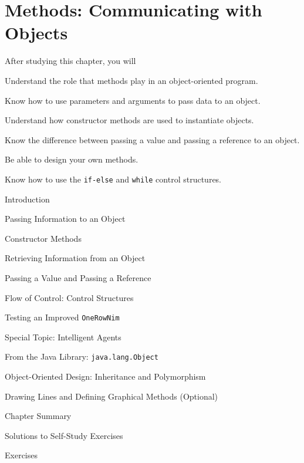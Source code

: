 
\setcounter{chapter}{2}
\setcounter{SSTUDYcount}{1}
\chapter{Methods: Communicating with Objects}
\label{chapter-methods}


\CObegin
{}
\label{objectives}
\noindent After studying this chapter, you will

\begin{COBL}
\item  Understand the role that methods play in an
  object-oriented program.
\item  Know how to use parameters and arguments to pass data to an object.
\item  Understand how constructor methods are used to instantiate objects.

\item  Know the difference between passing a value and passing a reference
   to an object.
\item  Be able to design your own methods.
\item  Know how to use the {\tt if-else} and {\tt while} control structures.
\end{COBL}

\label{outline}
\begin{COL}
\item Introduction
\item Passing Information to an Object
\item Constructor Methods
\item Retrieving Information from an Object
\item Passing a Value and Passing a Reference
\item Flow of Control: Control Structures
\item Testing an Improved {\tt OneRowNim}
\item[] {{\color{cyan}Special Topic:} Intelligent Agents}
\item From the Java Library: {\tt java.lang.Object}
\item Object-Oriented Design: Inheritance and Polymorphism
\item Drawing Lines and Defining Graphical Methods (Optional)
\par\small\item[] Chapter Summary
\par\small\item[] Solutions to Self-Study Exercises
\par\small\item[] Exercises
\end{COL}
\COend

